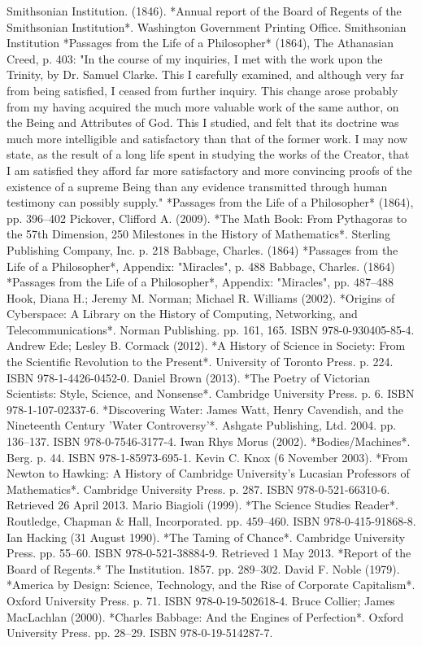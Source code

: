 \begin{enumerate}
Smithsonian Institution. (1846). *Annual report of the Board of Regents of the Smithsonian Institution*. Washington Government Printing Office. Smithsonian Institution  
*Passages from the Life of a Philosopher* (1864), The Athanasian Creed, p. 403:  
"In the course of my inquiries, I met with the work upon the Trinity, by Dr. Samuel Clarke. This I carefully examined, and although very far from being satisfied, I ceased from further inquiry. This change arose probably from my having acquired the much more valuable work of the same author, on the Being and Attributes of God. This I studied, and felt that its doctrine was much more intelligible and satisfactory than that of the former work. I may now state, as the result of a long life spent in studying the works of the Creator, that I am satisfied they afford far more satisfactory and more convincing proofs of the existence of a supreme Being than any evidence transmitted through human testimony can possibly supply."  
*Passages from the Life of a Philosopher* (1864), pp. 396–402  
Pickover, Clifford A. (2009). *The Math Book: From Pythagoras to the 57th Dimension, 250 Milestones in the History of Mathematics*. Sterling Publishing Company, Inc. p. 218  
Babbage, Charles. (1864) *Passages from the Life of a Philosopher*, Appendix: "Miracles", p. 488  
Babbage, Charles. (1864) *Passages from the Life of a Philosopher*, Appendix: "Miracles", pp. 487–488  
Hook, Diana H.; Jeremy M. Norman; Michael R. Williams (2002). *Origins of Cyberspace: A Library on the History of Computing, Networking, and Telecommunications*. Norman Publishing. pp. 161, 165. ISBN 978-0-930405-85-4.  
Andrew Ede; Lesley B. Cormack (2012). *A History of Science in Society: From the Scientific Revolution to the Present*. University of Toronto Press. p. 224. ISBN 978-1-4426-0452-0.  
Daniel Brown (2013). *The Poetry of Victorian Scientists: Style, Science, and Nonsense*. Cambridge University Press. p. 6. ISBN 978-1-107-02337-6.  
*Discovering Water: James Watt, Henry Cavendish, and the Nineteenth Century 'Water Controversy'*. Ashgate Publishing, Ltd. 2004. pp. 136–137. ISBN 978-0-7546-3177-4.  
Iwan Rhys Morus (2002). *Bodies/Machines*. Berg. p. 44. ISBN 978-1-85973-695-1.  
Kevin C. Knox (6 November 2003). *From Newton to Hawking: A History of Cambridge University's Lucasian Professors of Mathematics*. Cambridge University Press. p. 287. ISBN 978-0-521-66310-6. Retrieved 26 April 2013.  
Mario Biagioli (1999). *The Science Studies Reader*. Routledge, Chapman & Hall, Incorporated. pp. 459–460. ISBN 978-0-415-91868-8.  
Ian Hacking (31 August 1990). *The Taming of Chance*. Cambridge University Press. pp. 55–60. ISBN 978-0-521-38884-9. Retrieved 1 May 2013.  
*Report of the Board of Regents.* The Institution. 1857. pp. 289–302.  
David F. Noble (1979). *America by Design: Science, Technology, and the Rise of Corporate Capitalism*. Oxford University Press. p. 71. ISBN 978-0-19-502618-4.  
Bruce Collier; James MacLachlan (2000). *Charles Babbage: And the Engines of Perfection*. Oxford University Press. pp. 28–29. ISBN 978-0-19-514287-7.
\end{enumerate}